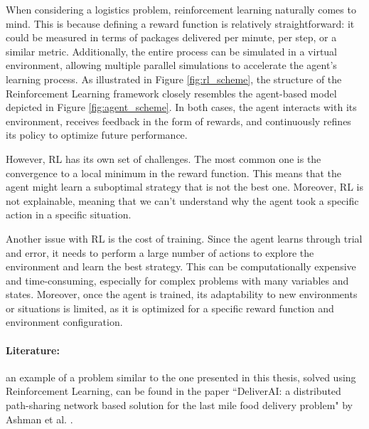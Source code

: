 When considering a logistics problem, reinforcement learning naturally comes to mind.
This is because defining a reward function is relatively straightforward: it could
be measured in terms of packages delivered per minute, per step, or a similar metric.
Additionally, the entire process can be simulated in a virtual environment,
allowing multiple parallel simulations to accelerate the agent's learning
process. As illustrated in Figure \ref{fig:rl_scheme}, the structure of the
Reinforcement Learning framework closely resembles the agent-based model
depicted in Figure \ref{fig:agent_scheme}. In both cases, the agent interacts
with its environment, receives feedback in the form of rewards, and continuously
refines its policy to optimize future performance.

However, RL has its own set of challenges. The most common one is the
convergence to a local minimum in the reward function. This means that the agent
might learn a suboptimal strategy that is not the best one. Moreover, RL is not explainable,
meaning that we can't understand why the agent took a specific action in a
specific situation.

Another issue with RL is the cost of training. Since the agent learns through trial
and error, it needs to perform a large number of actions to explore the
environment and learn the best strategy. This can be computationally expensive and
time-consuming, especially for complex problems with many variables and states. Moreover,
once the agent is trained, its adaptability to new environments or situations is
limited, as it is optimized for a specific reward function and environment
configuration.

\paragraph{Literature:}
an example of a problem similar to the one presented in this thesis, solved
using Reinforcement Learning, can be found in the paper ``DeliverAI: a
distributed path-sharing network based solution for the last mile food delivery
problem" by Ashman et al. \cite{mehra2024deliveraireinforcementlearningbased}.

